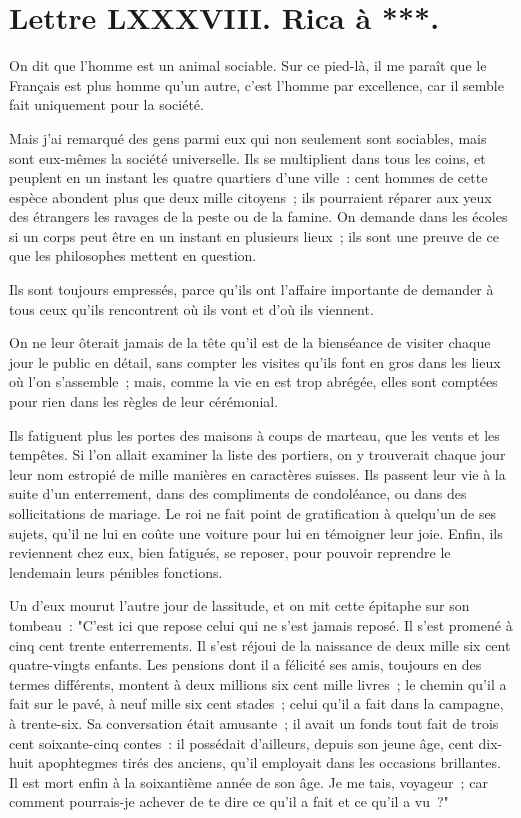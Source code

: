 \documentclass[french,twoside]{book} %
\newcommand{\dateline}[1]{\medskip{\RaggedLeft{#1}\par}\bigskip}
\begin{document}
\dateline{À Paris, le 1er de la lune de Gemmadi 2, 1715.}
\section[{Lettre LXXXVIII. Rica à ***.}]{Lettre LXXXVIII. Rica à ***.}\renewcommand{\leftmark}{Lettre LXXXVIII. Rica à ***.}

\noindent On dit que l’homme est un animal sociable. Sur ce pied-là, il me paraît que le Français est plus homme qu’un autre, c’est l’homme par excellence, car il semble fait uniquement pour la société.\par
Mais j’ai remarqué des gens parmi eux qui non seulement sont sociables, mais sont eux-mêmes la société universelle. Ils se multiplient dans tous les coins, et peuplent en un instant les quatre quartiers d’une ville : cent hommes de cette espèce abondent plus que deux mille citoyens ; ils pourraient réparer aux yeux des étrangers les ravages de la peste ou de la famine. On demande dans les écoles si un corps peut être en un instant en plusieurs lieux ; ils sont une preuve de ce que les philosophes mettent en question.\par
Ils sont toujours empressés, parce qu’ils ont l’affaire importante de demander à tous ceux qu’ils rencontrent où ils vont et d’où ils viennent.\par
On ne leur ôterait jamais de la tête qu’il est de la bienséance de visiter chaque jour le public en détail, sans compter les visites qu’ils font en gros dans les lieux où l’on s’assemble ; mais, comme la vie en est trop abrégée, elles sont comptées pour rien dans les règles de leur cérémonial.\par
Ils fatiguent plus les portes des maisons à coups de marteau, que les vents et les tempêtes. Si l’on allait examiner la liste des portiers, on y trouverait chaque jour leur nom estropié de mille manières en caractères suisses. Ils passent leur vie à la suite d’un enterrement, dans des compliments de condoléance, ou dans des sollicitations de mariage. Le roi ne fait point de gratification à quelqu’un de ses sujets, qu’il ne lui en coûte une voiture pour lui en témoigner leur joie. Enfin, ils reviennent chez eux, bien fatigués, se reposer, pour pouvoir reprendre le lendemain leurs pénibles fonctions.\par
Un d’eux mourut l’autre jour de lassitude, et on mit cette épitaphe sur son tombeau : "C’est ici que repose celui qui ne s’est jamais reposé. Il s’est promené à cinq cent trente enterrements. Il s’est réjoui de la naissance de deux mille six cent quatre-vingts enfants. Les pensions dont il a félicité ses amis, toujours en des termes différents, montent à deux millions six cent mille livres ; le chemin qu’il a fait sur le pavé, à neuf mille six cent stades ; celui qu’il a fait dans la campagne, à trente-six. Sa conversation était amusante ; il avait un fonds tout fait de trois cent soixante-cinq contes : il possédait d’ailleurs, depuis son jeune âge, cent dix-huit apophtegmes tirés des anciens, qu’il employait dans les occasions brillantes. Il est mort enfin à la soixantième année de son âge. Je me tais, voyageur ; car comment pourrais-je achever de te dire ce qu’il a fait et ce qu’il a vu ?"\par
\end{document}
